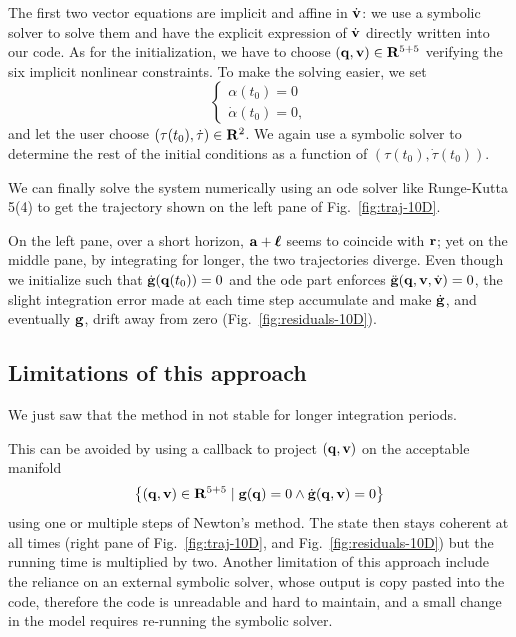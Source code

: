 The first two vector equations are implicit and affine in $\dot{\vb v}$: we use a symbolic solver to solve them and have the explicit expression of $\dot{\vb v}$ directly written into our code.
As for the initialization, we have to choose $(\vb q, \vb v) \in \mathbf{R}^{5+5}$ verifying the six implicit nonlinear constraints.
To make the solving easier, we set
\begin{equation}\begin{cases}
    \alpha(t_0) = 0 \\
    \dot \alpha(t_0) = 0,
\end{cases}\end{equation}
and let the user choose $(\tau(t_0), \dot \tau) \in \mathbf{R}^2$.
We again use a symbolic solver to determine the rest of the initial conditions as a function of $(\tau(t_0), \dot \tau(t_0))$.

We can finally solve the system numerically using an \ac{ode} solver like Runge-Kutta 5(4) to get the trajectory shown on the left pane of Fig.~\ref{fig:traj-10D}.

On the left pane, over a short horizon, $\vb a + \boldsymbol{\ell}$ seems to coincide with $\vb r$; yet on the middle pane, by integrating for longer, the two trajectories diverge.
Even though we initialize such that $\dot{\vb g}(\vb q(t_0)) = 0$ and the \ac{ode} part enforces $\ddot{\vb g}(\vb q, \vb v, \dot{\vb v}) = 0$, the slight integration error made at each time step accumulate and make $\dot{\vb g}$, and eventually $\vb g$, drift away from zero (Fig.~\ref{fig:residuals-10D}).

\subsection{Limitations of this approach}

We just saw that the method in not stable for longer integration periods.

This can be avoided by using a callback to project $(\vb q, \vb v)$ on the acceptable manifold
\begin{equation}
    \left\{ (\vb q, \vb v) \in \mathbf{R}^{5+5} \mid \vb g(\vb q) = 0 \land \dot{\vb g}(\vb q, \vb v) = 0 \right\}
\end{equation}
using one or multiple steps of Newton's method.
The state then stays coherent at all times (right pane of Fig.~\ref{fig:traj-10D}, and Fig.~\ref{fig:residuals-10D}) but the running time is multiplied by two.
Another limitation of this approach include the reliance on an external symbolic solver, whose output is copy pasted into the code, therefore the code is unreadable and hard to maintain, and a small change in the model requires re-running the symbolic solver.

